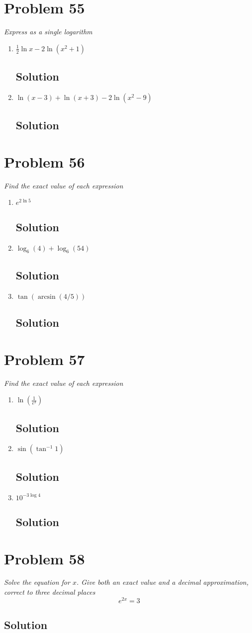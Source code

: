 \documentclass[11pt]{article}
\newcommand{\soln}{\subsection*}
\newcommand{\qn}{\textit}
\begin{document}
\section*{Problem 55}

\qn{Express as a single logarithm}
\begin{enumerate}
	\item \qn{$\frac{1}{2}\ln{x}-2\ln(x^2+1)$}
	\soln{Solution}
	
	\item \qn{$\ln(x-3)+\ln(x+3)-2\ln(x^2-9)$}
	\soln{Solution}
\end{enumerate}

\section*{Problem 56}

\qn{Find the exact value of each expression}
\begin{enumerate}
	\item \qn{$e^{2\ln5}$}
	\soln{Solution}
	
	\item \qn{$\log_6(4)+\log_6(54)$}
	\soln{Solution}
	
	\item \qn{$\tan(\arcsin(4/5))$}
	\soln{Solution}
\end{enumerate}

\section*{Problem 57}

\qn{Find the exact value of each expression}
\begin{enumerate}
	\item \qn{$\ln(\frac{1}{e^3})$}
	\soln{Solution}
	
	\item \qn{$\sin(\tan^{-1}1)$}
	\soln{Solution}
	
	\item \qn{$10^{-3\log4}$}
	\soln{Solution}
\end{enumerate}

\section*{Problem 58}

\qn{Solve the equation for $x$. Give both an exact value and a decimal approximation, correct to three decimal places $$e^{2x}=3$$}
\soln{Solution}
\end{document}
